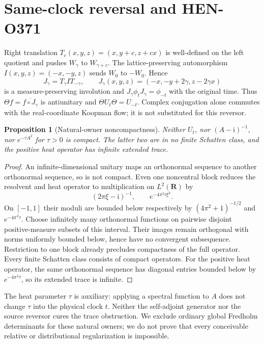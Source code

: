 \documentclass[10pt]{article}
\newtheorem{proposition}{Proposition}
\newcommand{\R}{\mathbf R}
\newcommand{\ii}{\mathrm i}
\begin{document}
\section{Same-clock reversal and HEN-O371}
Right translation $T_c(x,y,z)=(x,y+c,z+cx)$ is well-defined on the
left quotient and pushes $W_\gamma$ to $W_{\gamma+c}$.
The lattice-preserving automorphism $I(x,y,z)=(-x,-y,z)$ sends $W_0$
to $-W_0$. Hence
\[
 J_\gamma=T_\gamma I T_{-\gamma},\qquad
 J_\gamma(x,y,z)=(-x,-y+2\gamma,z-2\gamma x)
\]
is a measure-preserving involution and
$J_\gamma\phi_tJ_\gamma=\phi_{-t}$ with the original time.
Thus $\Theta f=\overline{f\circ J_\gamma}$ is antiunitary and
$\Theta U_t\Theta=U_{-t}$. Complex conjugation alone commutes with the
real-coordinate Koopman flow; it is not substituted for this reversor.

\begin{proposition}[Natural-owner noncompactness]
Neither $U_t$, nor $(A-\ii)^{-1}$, nor $e^{-\tau A^2}$ for $\tau>0$
is compact. The latter two are in no finite Schatten class, and the
positive heat operator has infinite extended trace.
\end{proposition}
\begin{proof}
An infinite-dimensional unitary maps an orthonormal sequence to another
orthonormal sequence, so is not compact. Even one noncentral block reduces
the resolvent and heat operator to multiplication on $L^2(\R)$ by
\[
 (2\pi\xi-\ii)^{-1},\qquad e^{-4\pi^2\tau\xi^2}.
\]
On $[-1,1]$ their moduli are bounded below respectively by
$(4\pi^2+1)^{-1/2}$ and $e^{-4\pi^2\tau}$. Choose infinitely many
orthonormal functions on pairwise disjoint positive-measure subsets of
this interval. Their images remain orthogonal with norms uniformly
bounded below, hence have no convergent subsequence. Restriction to one
block already precludes compactness of the full operator. Every finite
Schatten class consists of compact operators. For the positive heat
operator, the same orthonormal sequence has diagonal entries bounded
below by $e^{-4\pi^2\tau}$, so its extended trace is infinite.
\end{proof}

The heat parameter $\tau$ is auxiliary: applying a spectral function to
$A$ does not change $\tau$ into the physical clock $t$. Neither the
self-adjoint generator nor the source reversor cures the trace obstruction.
We exclude ordinary global Fredholm determinants for these natural owners;
we do not prove that every conceivable relative or distributional
regularization is impossible.
\end{document}
